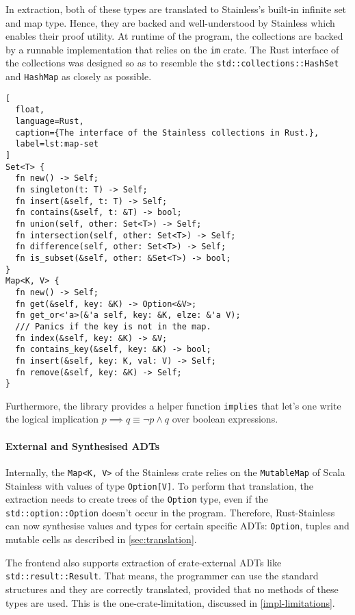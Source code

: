 In extraction, both of these types are translated to Stainless's built-in
infinite set and map type. Hence, they are backed and well-understood by
Stainless which enables their proof utility. At runtime of the program, the
collections are backed by a runnable implementation that relies on the
\lstinline!im! crate. The Rust interface of the collections was designed so as
to resemble the \lstinline!std::collections::HashSet! and \lstinline!HashMap! as
closely as possible.

\begin{lstlisting}[
  float,
  language=Rust,
  caption={The interface of the Stainless collections in Rust.},
  label=lst:map-set
]
Set<T> {
  fn new() -> Self;
  fn singleton(t: T) -> Self;
  fn insert(&self, t: T) -> Self;
  fn contains(&self, t: &T) -> bool;
  fn union(self, other: Set<T>) -> Self;
  fn intersection(self, other: Set<T>) -> Self;
  fn difference(self, other: Set<T>) -> Self;
  fn is_subset(&self, other: &Set<T>) -> bool;
}
Map<K, V> {
  fn new() -> Self;
  fn get(&self, key: &K) -> Option<&V>;
  fn get_or<'a>(&'a self, key: &K, elze: &'a V);
  /// Panics if the key is not in the map.
  fn index(&self, key: &K) -> &V;
  fn contains_key(&self, key: &K) -> bool;
  fn insert(&self, key: K, val: V) -> Self;
  fn remove(&self, key: &K) -> Self;
}
\end{lstlisting}

Furthermore, the library provides a helper function
\passthrough{\lstinline!implies!} that let's one write the logical
implication $p \implies q \equiv \neg{p} \land q$ over boolean expressions.


\paragraph{External and Synthesised ADTs}

Internally, the \lstinline!Map<K, V>! of the Stainless crate relies on the
\lstinline!MutableMap! of Scala Stainless with values of type
\lstinline!Option[V]!. To perform that translation, the extraction needs to
create trees of the \lstinline!Option! type, even if the
\lstinline!std::option::Option! doesn't occur in the program. Therefore,
Rust-Stainless can now synthesise values and types for certain specific ADTs:
\lstinline!Option!, tuples and mutable cells as described in
\autoref{sec:translation}.

The frontend also supports extraction of crate-external ADTs like
\lstinline!std::result::Result!. That means, the programmer can use the standard
structures and they are correctly translated, provided that no methods of these
types are used. This is the one-crate-limitation, discussed in
\autoref{impl-limitations}.

